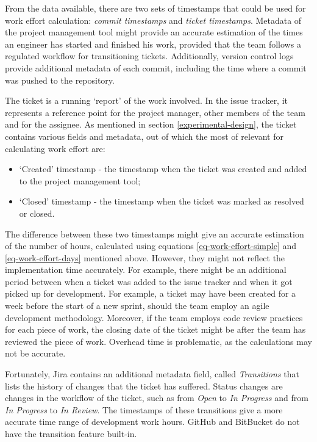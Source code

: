 \documentclass{mpaper}
\begin{document}
From the data available, there are two sets of timestamps that could be used for
work effort calculation: \emph{commit timestamps} and \emph{ticket timestamps}.
Metadata of the project management tool might provide an accurate estimation of
the times an engineer has started and finished his work, provided that the team
follows a regulated workflow for transitioning tickets. Additionally, version
control logs provide additional metadata of each commit, including the time
where a commit was pushed to the repository. 

The ticket is a running `report' of the work involved. In the issue tracker, it
represents a reference point for the project manager, other members of the team
and for the assignee. As mentioned in section \ref{experimental-design}, the
ticket contains various fields and metadata, out of which the most of relevant
for calculating work effort are:

\begin{itemize}
  \item `Created' timestamp - the timestamp when the ticket was created and
  added to the project management tool;
  \item `Closed' timestamp - the timestamp when the ticket was marked as
  resolved or closed.  
\end{itemize}

The difference between these two timestamps might give an accurate estimation of
the number of hours, calculated using equations \ref{eq-work-effort-simple} and
\ref{eq-work-effort-days} mentioned above. However, they might not reflect the
implementation time accurately. For example, there might be an additional period
between when a ticket was added to the issue tracker and when it got picked up
for development. For example, a ticket may have been created for a week before
the start of a new sprint, should the team employ an agile development
methodology. Moreover, if the team employs code review practices for each piece
of work, the closing date of the ticket might be after the team has reviewed the
piece of work. Overhead time is problematic, as the calculations may not be
accurate. 

Fortunately, Jira contains an additional metadata field, called
\emph{Transitions} that lists the history of changes that the ticket has
suffered. Status changes are changes in the workflow of the ticket, such as from
\emph{Open} to \emph{In Progress} and from \emph{In Progress} to \emph{In
Review}. The timestamps of these transitions give a more accurate time range of
development work hours. GitHub and BitBucket do not have the transition feature
built-in.
\end{document}
